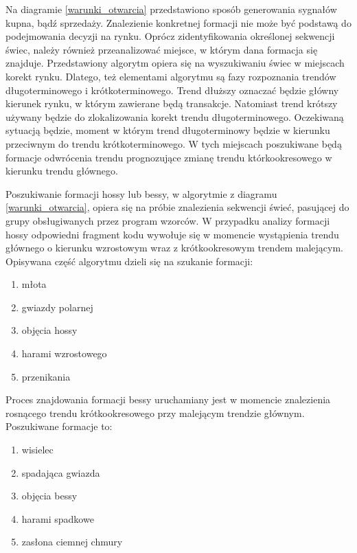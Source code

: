 \documentclass[pdflatex,11pt]{aghdpl}
\begin{document}
Na diagramie \ref{warunki_otwarcia} przedstawiono sposób generowania sygnałów kupna, bądź sprzedaży. Znalezienie konkretnej formacji nie może być podstawą do podejmowania decyzji na rynku. Oprócz zidentyfikowania określonej sekwencji świec, należy również przeanalizować miejsce, w którym dana formacja się znajduje. Przedstawiony algorytm opiera się na wyszukiwaniu świec w miejscach korekt rynku. Dlatego, też elementami algorytmu są fazy rozpoznania trendów długoterminowego i krótkoterminowego. Trend dłuższy oznaczać będzie główny kierunek rynku, w którym zawierane będą transakcje. Natomiast trend krótszy używany będzie do zlokalizowania korekt trendu długoterminowego. Oczekiwaną sytuacją będzie, moment w którym trend długoterminowy będzie w kierunku przeciwnym do trendu krótkoterminowego. W tych miejscach poszukiwane będą formacje odwrócenia trendu prognozujące zmianę trendu którkookresowego w kierunku trendu głównego. 


Poszukiwanie formacji hossy lub bessy, w algorytmie z diagramu \ref{warunki_otwarcia}, opiera się na próbie znalezienia sekwencji świeć, pasującej do grupy obsługiwanych przez program wzorców. W przypadku analizy formacji hossy odpowiedni fragment kodu wywołuje się w momencie wystąpienia trendu głównego o kierunku wzrostowym wraz z krótkookresowym trendem malejącym. Opisywana część algorytmu dzieli się na szukanie formacji:
\begin{enumerate}
\item młota
\item gwiazdy polarnej
\item objęcia hossy
\item harami wzrostowego
\item przenikania
\end{enumerate}

Proces znajdowania formacji bessy uruchamiany jest w momencie znalezienia rosnącego trendu krótkookresowego przy malejącym trendzie głównym. Poszukiwane formacje to:
\begin{enumerate}
\item wisielec
\item spadająca gwiazda
\item objęcia bessy
\item harami spadkowe
\item zasłona ciemnej chmury
\end{enumerate}
\end{document}

